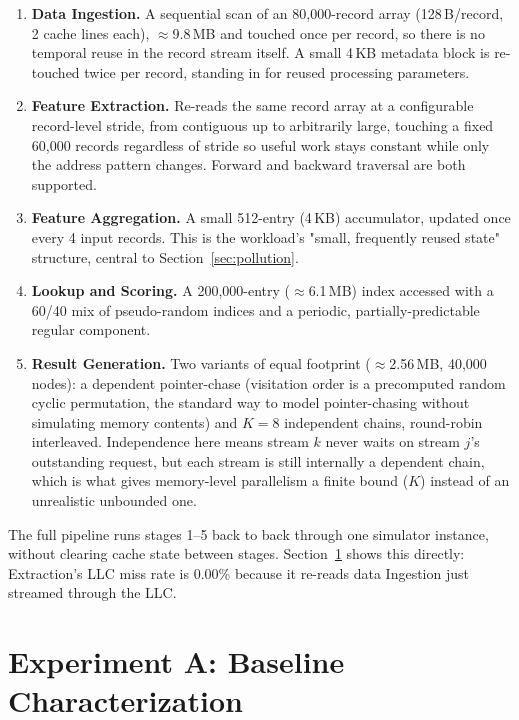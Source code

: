 \documentclass[11pt]{article}
\begin{document}
\begin{enumerate}[leftmargin=1.6em]
\item \textbf{Data Ingestion.} A sequential scan of an 80{,}000-record array
(128\,B/record, 2 cache lines each), $\approx$9.8\,MB and touched once per
record, so there is no temporal reuse in the record stream itself. A small
4\,KB metadata block is re-touched twice per record, standing in for reused
processing parameters.
\item \textbf{Feature Extraction.} Re-reads the same record array at a
configurable record-level stride, from contiguous up to arbitrarily large,
touching a fixed 60{,}000 records regardless of stride so useful work stays
constant while only the address pattern changes. Forward and backward
traversal are both supported.
\item \textbf{Feature Aggregation.} A small 512-entry (4\,KB) accumulator,
updated once every 4 input records. This is the workload's "small,
frequently reused state" structure, central to Section~\ref{sec:pollution}.
\item \textbf{Lookup and Scoring.} A 200{,}000-entry ($\approx$6.1\,MB) index
accessed with a 60/40 mix of pseudo-random indices and a periodic,
partially-predictable regular component.
\item \textbf{Result Generation.} Two variants of equal footprint
($\approx$2.56\,MB, 40{,}000 nodes): a dependent pointer-chase (visitation
order is a precomputed random cyclic permutation, the standard way to model
pointer-chasing without simulating memory contents) and $K=8$ independent
chains, round-robin interleaved. Independence here means stream $k$ never
waits on stream $j$'s outstanding request, but each stream is still
internally a dependent chain, which is what gives memory-level parallelism a
finite bound ($K$) instead of an unrealistic unbounded one.
\end{enumerate}

The full pipeline runs stages 1--5 back to back through one simulator
instance, without clearing cache state between stages. Section~\ref{sec:baseline}
shows this directly: Extraction's LLC miss rate is 0.00\% because it re-reads
data Ingestion just streamed through the LLC.

\section{Experiment A: Baseline Characterization}
\label{sec:baseline}
\end{document}
